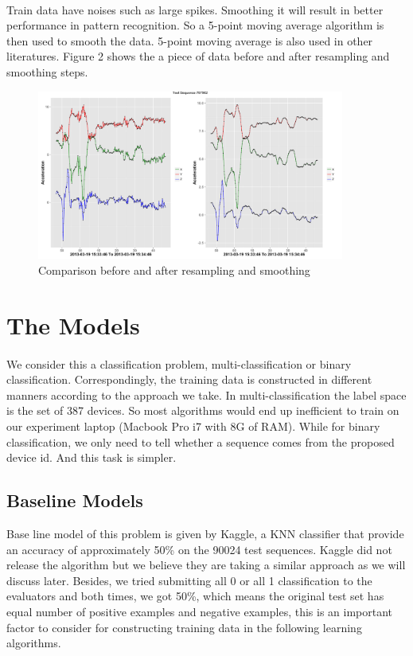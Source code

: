 \documentclass[11pt,letterpaper]{article}
\begin{document}
		\paragraph{} Train data have noises such as large spikes. Smoothing it will result in better performance in pattern recognition. So a 5-point moving average algorithm is then used to smooth the data. 5-point moving average is also used in other literatures. Figure 2 shows the a piece of data before and after resampling and smoothing steps.
		\begin{figure}
			\centering
			\includegraphics[width=0.9\textwidth]{Rplot.pdf}
			\caption{Comparison before and after resampling and smoothing}
		\end{figure}
	

\section{The Models}
\label{sec:models}
\paragraph{} We consider this a classification problem, multi-classification or binary classification. Correspondingly, the training data is constructed in different manners according to the approach we take. In multi-classification the label space is the set of 387 devices. So most algorithms would end up inefficient to train on our experiment laptop (Macbook Pro i7 with 8G of RAM). While for binary classification, we only need to tell whether a sequence comes from the proposed device id. And this task is simpler.

\subsection{Baseline Models}
\label{sec:baseline-models}
Base line model of this problem is given by Kaggle, a KNN classifier that provide an accuracy of approximately 50\% on the 90024 test sequences. Kaggle did not release the algorithm but we believe they are taking a similar approach as we will discuss later. Besides, we tried submitting all 0 or all 1 classification to the evaluators and both times, we got 50\%, which means the original test set has equal number of positive examples and negative examples, this is an important factor to consider for constructing training data in the following learning algorithms.
\end{document}
